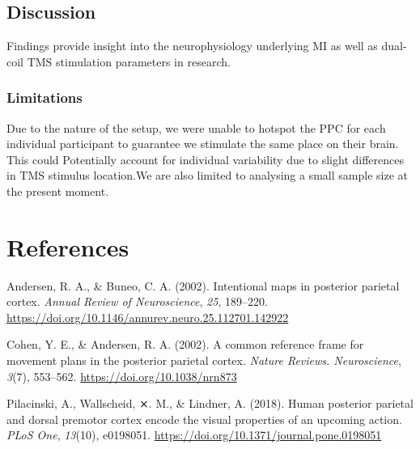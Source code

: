 \documentclass[
]{article}
\newlength{\cslhangindent}
\newenvironment{CSLReferences}[2] %
 {\begin{list}{}{%
  \setlength{\itemindent}{0pt}
  \setlength{\leftmargin}{0pt}
  \setlength{\parsep}{0pt}
  \ifodd #1
   \setlength{\leftmargin}{\cslhangindent}
   \setlength{\itemindent}{-1\cslhangindent}
  \fi
  \setlength{\itemsep}{#2\baselineskip}}}
 {\end{list}}
\begin{document}
\subsection{Discussion}\label{discussion}

Findings provide insight into the neurophysiology underlying MI as well
as dual-coil TMS stimulation parameters in research.

\subsubsection{Limitations}\label{limitations}

Due to the nature of the setup, we were unable to hotspot the PPC for
each individual participant to guarantee we stimulate the same place on
their brain. This could Potentially account for individual variability
due to slight differences in TMS stimulus location.We are also limited
to analysing a small sample size at the present moment.

\section*{References}\label{references}

\label{refs}
\begin{CSLReferences}{1}{0}
Andersen, R. A., \& Buneo, C. A. (2002). Intentional maps in posterior
parietal cortex. \emph{Annual Review of Neuroscience}, \emph{25},
189--220. \url{https://doi.org/10.1146/annurev.neuro.25.112701.142922}

Cohen, Y. E., \& Andersen, R. A. (2002). A common reference frame for
movement plans in the posterior parietal cortex. \emph{Nature Reviews.
Neuroscience}, \emph{3}(7), 553--562.
\url{https://doi.org/10.1038/nrn873}

Pilacinski, A., Wallscheid, ⨯. M., \& Lindner, A. (2018). Human
posterior parietal and dorsal premotor cortex encode the visual
properties of an upcoming action. \emph{PLoS One}, \emph{13}(10),
e0198051. \url{https://doi.org/10.1371/journal.pone.0198051}

\end{CSLReferences}
\end{document}
